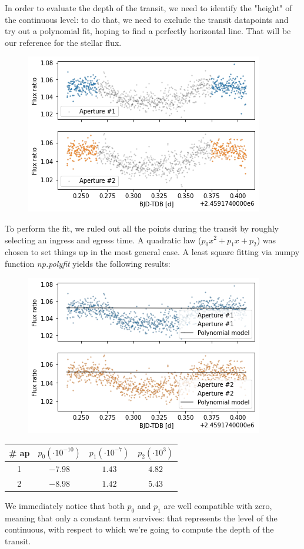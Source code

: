 \documentclass[a4paper,11pt,twocolumn]{article}
\begin{document}
In order to evaluate the depth of the transit, we need to identify the "height" 
of the continuous level: to do that, we need to exclude the transit datapoints 
and try out a polynomial fit, hoping to find a perfectly horizontal line. That will 
be our reference for the stellar flux.
\begin{figure}[H]
    \centering  
    \includegraphics[scale=0.45, angle=0]{../pictures/taste/fit_setting.png}
\end{figure}
To perform the fit, we ruled out all the points during the transit by roughly 
selecting an ingress and egress time. A quadratic law ($p_0 x^2 + p_1 x +p_2$)
was chosen to set things up in the most general case. A least square fitting 
via numpy function \textit{np.polyfit} yields the following results:
\begin{figure}[H]
    \centering  
    \includegraphics[scale=0.45, angle=0]{../pictures/taste/fit.png}
\end{figure}
\begin{center}
    \begin{tabular}{|c|c|c|c|}
    \hline
    \# ap & $p_0 (\cdot 10^{-10})$ & $p_1 (\cdot 10^{-7})$ & $p_2 ( \cdot 10^3)$ \\
    \hline
    1 &  $-7.98$   & $1.43$    &  $4.82$\\
    2 & $-8.98$ & $1.42$  & $5.43$\\
    \hline
    \end{tabular}
\end{center}
We immediately notice that both $p_0$ and $p_1$ are well compatible with zero,
meaning that only a constant term survives: that represents the level of the 
continuous, with respect to which we're going to compute the depth of the
transit.
\end{document}
